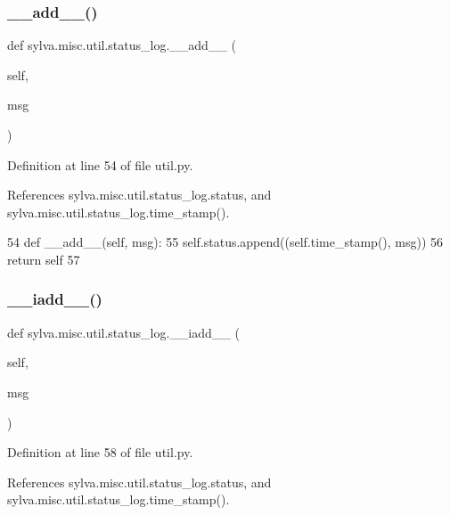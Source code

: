 \subsubsection{\texorpdfstring{\+\_\+\+\_\+add\+\_\+\+\_\+()}{\_\_add\_\_()}}
{\footnotesize\ttfamily def sylva.\+misc.\+util.\+status\+\_\+log.\+\_\+\+\_\+add\+\_\+\+\_\+ (\begin{DoxyParamCaption}\item[{}]{self,  }\item[{}]{msg }\end{DoxyParamCaption})}



Definition at line 54 of file util.\+py.



References sylva.\+misc.\+util.\+status\+\_\+log.\+status, and sylva.\+misc.\+util.\+status\+\_\+log.\+time\+\_\+stamp().


\begin{DoxyCode}
54     \textcolor{keyword}{def }\_\_add\_\_(self, msg):
55         self.status.append((self.time\_stamp(), msg))
56         \textcolor{keywordflow}{return} self
57 
\end{DoxyCode}
\mbox{\label{classsylva_1_1misc_1_1util_1_1status__log_ab13cd7b4f04bc397105042ebfb34cfaa}} 
\subsubsection{\texorpdfstring{\+\_\+\+\_\+iadd\+\_\+\+\_\+()}{\_\_iadd\_\_()}}
{\footnotesize\ttfamily def sylva.\+misc.\+util.\+status\+\_\+log.\+\_\+\+\_\+iadd\+\_\+\+\_\+ (\begin{DoxyParamCaption}\item[{}]{self,  }\item[{}]{msg }\end{DoxyParamCaption})}



Definition at line 58 of file util.\+py.



References sylva.\+misc.\+util.\+status\+\_\+log.\+status, and sylva.\+misc.\+util.\+status\+\_\+log.\+time\+\_\+stamp().


